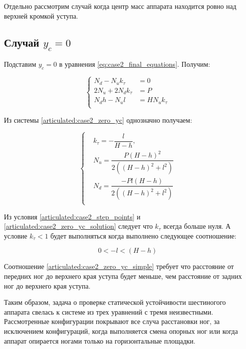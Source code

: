 Отдельно рассмотрим случай когда центр масс аппарата находится ровно над верхней кромкой уступа.

\subsection{Случай $y_c = 0$}

Подставим $y_c = 0$ в уравнения \ref{eq:case2_final_equations}. Получим:

\begin{equation}
\label{articulated:case2_zero_yc}
\left\{
\begin{alignedat}{3}
N_d - N_uk_\tau &= 0 \\
2N_u+2N_dk_\tau &= P \\
N_dh - N_ul &= HN_uk_\tau\\
\end{alignedat}
\right.
\end{equation}

Из системы \ref{articulated:case2_zero_yc} однозначно получаем:

\begin{equation}
\label{articulated:case2_zero_yc_solution}
\left\{
\begin{alignedat}{3}
&k_\tau = -\dfrac{l}{H-h},\\
&N_u = \dfrac{P(H-h)^2}{2((H-h)^2+l^2)}\\
&N_d = \dfrac{-Pl(H - h)}{2((H-h)^2+l^2)}\\
\end{alignedat}
\right.
\end{equation}

Из условия \ref{articulated:case2_step_points} и \ref{articulated:case2_zero_yc_solution} следует что $k_\tau$ всегда больше нуля. А условие $k_\tau < 1$ будет выполняться когда выполнено следующее соотношение:

\begin{equation}
\label{articulated:case2_zero_yc_simple}
  0 < -l < (H-h)
\end{equation}

Соотношение \ref{articulated:case2_zero_yc_simple} требует что расстояние от передних ног до верхнего края уступа будет меньше, чем расстояние от задних ног до верхнего края уступа.

Таким образом, задача о проверке статической устойчивости шестиногого аппарата свелась к системе из трех уравнений с тремя неизвестными. Рассмотренные конфигурации покрывают все случа расстановки ног, за исключением конфигураций, когда выполняется смена опорных ног или когда аппарат опирается ногами только на горизонтальные площадки.

